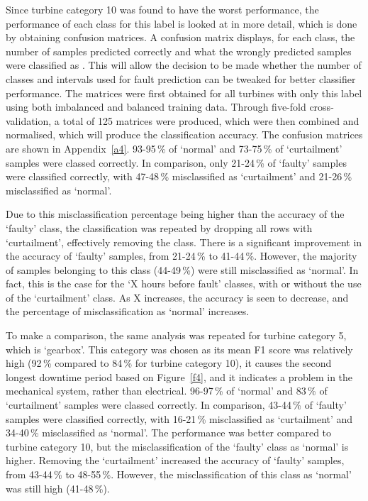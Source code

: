Since turbine category 10 was found to have the worst performance, the performance of each class for this label is looked at in more detail, which is done by obtaining confusion matrices. A confusion matrix displays, for each class, the number of samples predicted correctly and what the wrongly predicted samples were classified as \cite{33M}. This will allow the decision to be made whether the number of classes and intervals used for fault prediction can be tweaked for better classifier performance. The matrices were first obtained for all turbines with only this label using both imbalanced and balanced training data. Through five-fold cross-validation, a total of 125 matrices were produced, which were then combined and normalised, which will produce the classification accuracy. The confusion matrices are shown in Appendix~\ref{a4}. 93-95\,\% of `normal' and 73-75\,\% of `curtailment' samples were classed correctly. In comparison, only 21-24\,\% of `faulty' samples were classified correctly, with 47-48\,\% misclassified as `curtailment' and 21-26\,\% misclassified as `normal'.

Due to this misclassification percentage being higher than the accuracy of the `faulty' class, the classification was repeated by dropping all rows with `curtailment', effectively removing the class. There is a significant improvement in the accuracy of `faulty' samples, from 21-24\,\% to 41-44\,\%. However, the majority of samples belonging to this class (44-49\,\%) were still misclassified as `normal'. In fact, this is the case for the `X hours before fault' classes, with or without the use of the `curtailment' class. As X increases, the accuracy is seen to decrease, and the percentage of misclassification as `normal' increases.

To make a comparison, the same analysis was repeated for turbine category 5, which is `gearbox'. This category was chosen as its mean F1 score was relatively high (92\,\% compared to 84\,\% for turbine category 10), it causes the second longest downtime period based on Figure~\ref{f4}, and it indicates a problem in the mechanical system, rather than electrical. 96-97\,\% of `normal' and 83\,\% of `curtailment' samples were classed correctly. In comparison, 43-44\,\% of `faulty' samples were classified correctly, with 16-21\,\% misclassified as `curtailment' and 34-40\,\% misclassified as `normal'. The performance was better compared to turbine category 10, but the misclassification of the `faulty' class as `normal' is higher. Removing the `curtailment' increased the accuracy of `faulty' samples, from 43-44\,\% to 48-55\,\%. However, the misclassification of this class as `normal' was still high (41-48\,\%).

